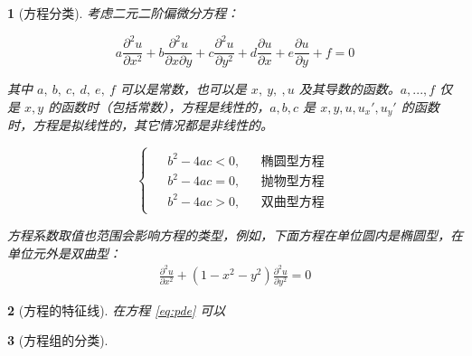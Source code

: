 \documentclass[zihao=5,UTF8]{report}
\theoremstyle{MyTheoremStyle} %
\theoremstyle{MySubsubsectionStyle} %
\newtheorem{definition}{}
\begin{document}
\begin{definition}[方程分类]
    考虑二元二阶偏微分方程：

    \begin{equation}\label{eq:pde}
        a\frac{\partial^2u}{\partial x^2}+b\frac{\partial^2u}{\partial x\partial y}+c\frac{\partial^2u}{\partial y^2}+d\frac{\partial u}{\partial x}+e\frac{\partial u}{\partial y}+f=0
    \end{equation}
    
    其中 $a,\ b,\ c,\ d,\ e,\ f$ 可以是常数，也可以是 $x,\ y,\ ,u$ 及其导数的函数。$a,...,f$ 仅是 $x,y$ 的函数时（包括常数），方程是线性的，$a,b,c$ 是 $x,y,u,u_x',u_y'$ 的函数时，方程是拟线性的，其它情况都是非线性的。
    
    \begin{equation}
        \begin{cases}
            \begin{aligned}
                &b^2 - 4ac < 0, && \text{椭圆型方程}\\ 
                &b^2 - 4ac = 0, && \text{抛物型方程}\\ 
                &b^2 - 4ac > 0, && \text{双曲型方程}
            \end{aligned}
        \end{cases}
    \end{equation}
    
    {\par\color{gray}\small
    方程系数取值也范围会影响方程的类型，例如，下面方程在单位圆内是椭圆型，在单位元外是双曲型：
    \begin{equation}
        \begin{aligned}\frac{\partial^2u}{\partial x^2}+(1-x^2-y^2)\frac{\partial^2u}{\partial y^2}=0\end{aligned}
    \end{equation}
    \par}
    
\end{definition}

\begin{definition}[方程的特征线]
    在方程 \ref*{eq:pde} 可以
\end{definition}

\begin{definition}[方程组的分类]

\end{definition}
\end{document}
